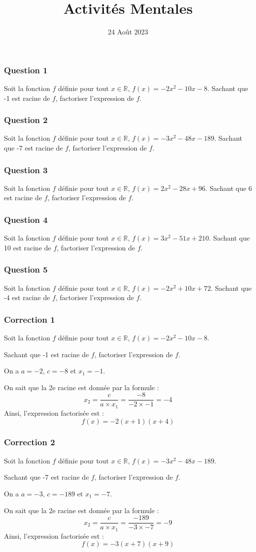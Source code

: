 \documentclass[15pt, mathserif]{beamer}
\title{Activités Mentales}
\date{24 Août 2023}
\newcommand{\R}{\mathbb{R}}			%
\begin{document}
\begin{frame}
    \titlepage
\end{frame}

\begin{frame} 
	\frametitle{Question 1}
Soit la fonction $f$ définie pour tout $x \in \R$, $f(x)=-2x^2-10x-8$. Sachant que -1 est racine de $f$, factoriser l'expression de $f$.\end{frame}


\begin{frame} 
	\frametitle{Question 2}
Soit la fonction $f$ définie pour tout $x \in \R$, $f(x)=-3x^2-48x-189$. Sachant que -7 est racine de $f$, factoriser l'expression de $f$.\end{frame}


\begin{frame} 
	\frametitle{Question 3}
Soit la fonction $f$ définie pour tout $x \in \R$, $f(x)=2x^2-28x+96$. Sachant que 6 est racine de $f$, factoriser l'expression de $f$.\end{frame}


\begin{frame} 
	\frametitle{Question 4}
Soit la fonction $f$ définie pour tout $x \in \R$, $f(x)=3x^2-51x+210$. Sachant que 10 est racine de $f$, factoriser l'expression de $f$.\end{frame}


\begin{frame} 
	\frametitle{Question 5}
Soit la fonction $f$ définie pour tout $x \in \R$, $f(x)=-2x^2+10x+72$. Sachant que -4 est racine de $f$, factoriser l'expression de $f$.\end{frame}


\begin{frame}
\vspace{-10mm}
	\frametitle{Correction 1}
Soit la fonction $f$ définie pour tout $x \in \R$, $f(x)=-2x^2-10x-8$. 
 
 Sachant que -1 est racine de $f$, factoriser l'expression de $f$. 
 
 On a $a=-2$, $c=-8$ et $x_1=-1$. 
 
 On sait que la 2e racine est donnée par la formule : $$x_2=\dfrac{c}{a \times x_1}=\dfrac{-8}{-2\times -1}=-4$$ Ainsi, l'expression factorisée est : $$f(x)=-2(x+1)(x+4)$$ 
 \end{frame}


\begin{frame}
\vspace{-10mm}
	\frametitle{Correction 2}
Soit la fonction $f$ définie pour tout $x \in \R$, $f(x)=-3x^2-48x-189$. 
 
 Sachant que -7 est racine de $f$, factoriser l'expression de $f$. 
 
 On a $a=-3$, $c=-189$ et $x_1=-7$. 
 
 On sait que la 2e racine est donnée par la formule : $$x_2=\dfrac{c}{a \times x_1}=\dfrac{-189}{-3\times -7}=-9$$ Ainsi, l'expression factorisée est : $$f(x)=-3(x+7)(x+9)$$ 
 \end{frame}
\end{document}
